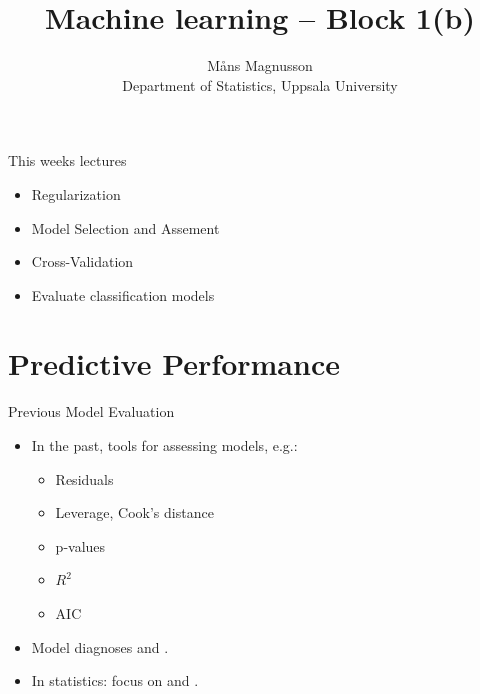 \documentclass[10pt,handout]{beamer}
\title[]{{\color{black}Machine learning -- Block 1(b)}}
\author[]{M{\aa}ns Magnusson\\Department of Statistics, Uppsala University}
\date{\currentsemester}
\begin{document}
\frame{\titlepage
}



\begin{frame}{This weeks lectures}
\begin{itemize}
\item Regularization
\item Model Selection and Assement
\item Cross-Validation
\item Evaluate classification models
\end{itemize}
\end{frame}




\section{Predictive Performance}
\frame{\sectionpage}

\begin{frame}{Previous Model Evaluation}
\begin{itemize}
\item In the past, tools for assessing models, e.g.:
\begin{itemize}
\item Residuals
\item Leverage, Cook's distance
\item p-values
\item $R^2$
\item AIC
\end{itemize}
\item Model diagnoses and .
\item In statistics: focus on  and .
\end{itemize}
\end{frame}
\end{document}
